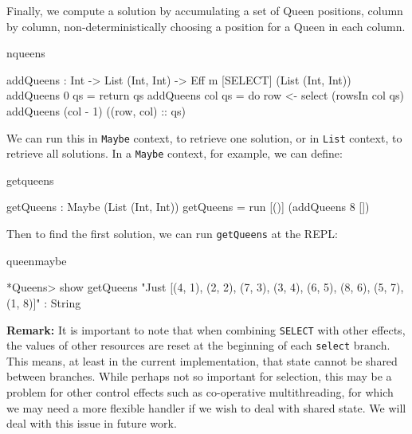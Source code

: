 \noindent
Finally, we compute a solution by accumulating a set of Queen positions,
column by column, non-deterministically choosing a position for a Queen in
each column.

\begin{SaveVerbatim}{nqueens}

addQueens : Int -> List (Int, Int) -> 
            Eff m [SELECT] (List (Int, Int))
addQueens 0   qs = return qs
addQueens col qs 
   = do row <- select (rowsIn col qs)
        addQueens (col - 1) ((row, col) :: qs)

\end{SaveVerbatim}

\noindent
We can run this in \texttt{Maybe} context, to retrieve one solution, or in
\texttt{List} context, to retrieve all solutions. In a
\texttt{Maybe} context, for example, we can define:

\begin{SaveVerbatim}{getqueens}

getQueens : Maybe (List (Int, Int))
getQueens = run [()] (addQueens 8 [])

\end{SaveVerbatim}

\noindent
Then to find the first solution, we can run \texttt{getQueens} at the \Idris{}
REPL:

\begin{SaveVerbatim}{queenmaybe}

*Queens> show getQueens
"Just [(4, 1), (2, 2), (7, 3), (3, 4), 
       (6, 5), (8, 6), (5, 7), (1, 8)]" : String

\end{SaveVerbatim}

\noindent
\textbf{Remark:} It is important to note that when combining \texttt{SELECT}
with other effects, the values of other resources are reset at the beginning
of each \texttt{select} branch. This means, at least in the current implementation,
that state cannot be shared between branches. While perhaps not so important
for selection, this may be a problem for other control effects such as 
co-operative multithreading, for which we may need a more flexible handler if
we wish to deal with shared state. We will deal with this issue in future work.
